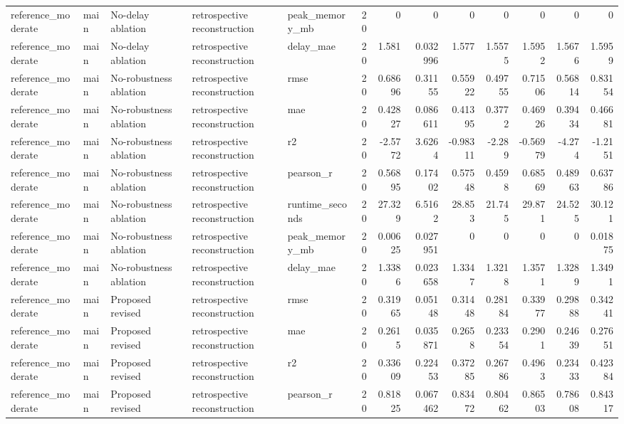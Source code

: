 \begin{table}[!htbp]
{{\begin{tabular}{lllllrrrrrrrr}
reference_moderate & main & No-delay ablation & retrospective reconstruction & peak_memory_mb & 20 & 0 & 0 & 0 & 0 & 0 & 0 & 0 \\
reference_moderate & main & No-delay ablation & retrospective reconstruction & delay_mae & 20 & 1.581 & 0.032996 & 1.577 & 1.5575 & 1.5952 & 1.5676 & 1.5959 \\
reference_moderate & main & No-robustness ablation & retrospective reconstruction & rmse & 20 & 0.68696 & 0.31155 & 0.55922 & 0.49755 & 0.71506 & 0.56814 & 0.83154 \\
reference_moderate & main & No-robustness ablation & retrospective reconstruction & mae & 20 & 0.42827 & 0.086611 & 0.41395 & 0.3772 & 0.46926 & 0.39434 & 0.46681 \\
reference_moderate & main & No-robustness ablation & retrospective reconstruction & r2 & 20 & -2.5772 & 3.6264 & -0.98311 & -2.289 & -0.56979 & -4.274 & -1.2151 \\
reference_moderate & main & No-robustness ablation & retrospective reconstruction & pearson_r & 20 & 0.56895 & 0.17402 & 0.57548 & 0.4598 & 0.68569 & 0.48963 & 0.63786 \\
reference_moderate & main & No-robustness ablation & retrospective reconstruction & runtime_seconds & 20 & 27.329 & 6.5162 & 28.853 & 21.745 & 29.871 & 24.525 & 30.121 \\
reference_moderate & main & No-robustness ablation & retrospective reconstruction & peak_memory_mb & 20 & 0.00625 & 0.027951 & 0 & 0 & 0 & 0 & 0.01875 \\
reference_moderate & main & No-robustness ablation & retrospective reconstruction & delay_mae & 20 & 1.3386 & 0.023658 & 1.3347 & 1.3218 & 1.3571 & 1.3289 & 1.3491 \\
reference_moderate & main & Proposed revised & retrospective reconstruction & rmse & 20 & 0.31965 & 0.05148 & 0.31448 & 0.28184 & 0.33977 & 0.29888 & 0.34241 \\
reference_moderate & main & Proposed revised & retrospective reconstruction & mae & 20 & 0.2615 & 0.035871 & 0.2658 & 0.23354 & 0.2901 & 0.24639 & 0.27651 \\
reference_moderate & main & Proposed revised & retrospective reconstruction & r2 & 20 & 0.33609 & 0.22453 & 0.37285 & 0.26786 & 0.4963 & 0.23433 & 0.42384 \\
reference_moderate & main & Proposed revised & retrospective reconstruction & pearson_r & 20 & 0.81825 & 0.067462 & 0.83472 & 0.80462 & 0.86503 & 0.78608 & 0.84317 \\

\end{tabular}}}
\end{table}
